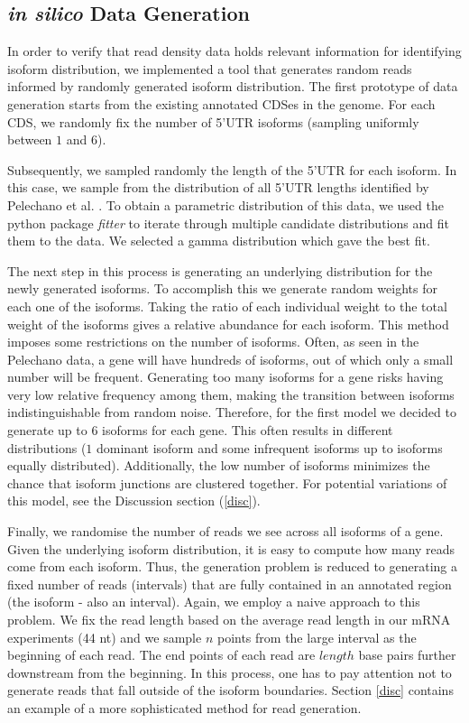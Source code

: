 \documentclass[12pt]{article}
\begin{document}


\subsection{\textit{in silico} Data Generation}

In order to verify that read density data holds relevant information for identifying isoform distribution, we implemented a tool that generates random reads informed by randomly generated isoform distribution. The first prototype of data generation starts from the existing annotated CDSes in the genome. For each CDS, we randomly fix the number of 5'UTR isoforms (sampling uniformly between $1$ and $6$). 

Subsequently, we sampled randomly the length of the 5'UTR for each isoform. In this case, we sample from the distribution of all 5'UTR lengths identified by Pelechano et al. \cite{Pelechano2013}. To obtain a parametric distribution of this data, we used the python package \textit{fitter} to iterate through multiple candidate distributions and fit them to the data. We selected a gamma distribution \cite{gamma} which gave the best fit. 

The next step in this process is generating an underlying distribution for the newly generated isoforms. To accomplish this we generate random weights for each one of the isoforms. Taking the ratio of each individual weight to the total weight of the isoforms gives a relative abundance for each isoform. This method imposes some restrictions on the number of isoforms. Often, as seen in the Pelechano data, a gene will have hundreds of isoforms, out of which only a small number will be frequent. Generating too many isoforms for a gene risks having very low relative frequency among them, making the transition between isoforms indistinguishable from random noise. Therefore, for the first model we decided to generate up to $6$ isoforms for each gene. This often results in different distributions ($1$ dominant isoform and some infrequent isoforms up to isoforms equally distributed). Additionally, the low number of isoforms minimizes the chance that isoform junctions are clustered together. For potential variations of this model, see the Discussion section (\ref{disc}).

Finally, we randomise the number of reads we see across all isoforms of a gene. Given the underlying isoform distribution, it is easy to compute how many reads come from each isoform. Thus, the generation problem is reduced to generating a fixed number of reads (intervals) that are fully contained in an annotated region (the isoform - also an interval). Again, we employ a naive approach to this problem. We fix the read length based on the average read length in our mRNA experiments (44 nt) and we sample $n$ points from the large interval as the beginning of each read. The end points of each read are $length$ base pairs further downstream from the beginning. In this process, one has to pay attention not to generate reads that fall outside of the isoform boundaries. Section \ref{disc} contains an example of a more sophisticated method for read generation.  
\end{document}
